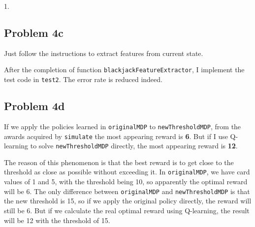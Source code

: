 \documentclass[paper=a4, fontsize=10pt]{scrartcl} %
\numberwithin{equation}{section} %
\numberwithin{figure}{section} %
\numberwithin{table}{section} %
\begin{document}
\begin{spacing}{1.}
\subsection{Problem 4c}
Just follow the instructions to extract features from current state.

After the completion of function \texttt{blackjackFeatureExtractor}, I implement the test code in \texttt{test2}. The error rate is reduced indeed.

\subsection{Problem 4d}
If we apply the policies learned in \texttt{originalMDP} to \texttt{newThresholdMDP}, from the awards acquired by \texttt{simulate} the most appearing reward is \textbf{6}. But if I use Q-learning to solve \texttt{newThresholdMDP} directly, the most appearing reward is \textbf{12}.

The reason of this phenomenon is that the best reward is to get close to the threshold as close as possible without exceeding it. In \texttt{originalMDP}, we have card values of 1 and 5, with the threshold being 10, so apparently the optimal reward will be 6. The only difference between \texttt{originalMDP} and \texttt{newThresholdMDP} is that the new threshold is 15, so if we apply the original policy directly, the reward will still be 6. But if we calculate the real optimal reward using Q-learning, the result will be 12 with the threshold of 15.








\end{spacing}
\end{document}
